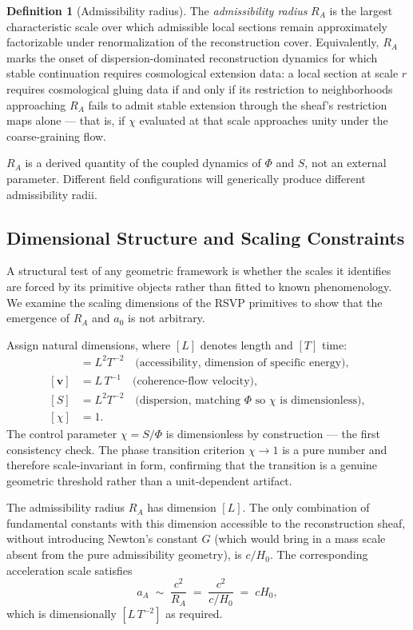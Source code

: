 \documentclass[11pt, a4paper]{article}
\theoremstyle{plain}
\theoremstyle{definition}
\newtheorem{definition}[theorem]{Definition}
\theoremstyle{remark}
\newcommand{\RA}{R_{\!A}}
\newcommand{\aA}{a_{\!A}}
\begin{document}
\begin{definition}[Admissibility radius]
\label{def:RA}
The \emph{admissibility radius} $\RA$ is the largest characteristic scale over which
admissible local sections remain approximately factorizable under renormalization of
the reconstruction cover. Equivalently, $\RA$ marks the onset of
dispersion-dominated reconstruction dynamics for which stable continuation requires
cosmological extension data: a local section at scale $r$ requires cosmological
gluing data if and only if its restriction to neighborhoods approaching $\RA$ fails
to admit stable extension through the sheaf's restriction maps alone --- that is, if
$\chi$ evaluated at that scale approaches unity under the coarse-graining flow.
\end{definition}

$\RA$ is a derived quantity of the coupled dynamics of $\Phi$ and $S$, not an
external parameter. Different field configurations will generically produce different
admissibility radii.

\subsection{Dimensional Structure and Scaling Constraints}
\label{sec:dimensional}

A structural test of any geometric framework is whether the scales it identifies are
forced by its primitive objects rather than fitted to known phenomenology. We examine
the scaling dimensions of the RSVP primitives to show that the emergence of $\RA$ and
$a_0$ is not arbitrary.

Assign natural dimensions, where $[L]$ denotes length and $[T]$ time:
\begin{align*}
  [\Phi] &= L^2 T^{-2} \quad \text{(accessibility, dimension of specific energy)}, \\
  [\mathbf{v}] &= L\,T^{-1} \quad \text{(coherence-flow velocity)}, \\
  [S] &= L^2 T^{-2} \quad \text{(dispersion, matching $\Phi$ so $\chi$ is dimensionless)}, \\
  [\chi] &= 1.
\end{align*}
The control parameter $\chi = S/\Phi$ is dimensionless by construction --- the first
consistency check. The phase transition criterion $\chi \to 1$ is a pure number and
therefore scale-invariant in form, confirming that the transition is a genuine
geometric threshold rather than a unit-dependent artifact.

The admissibility radius $\RA$ has dimension $[L]$. The only combination of
fundamental constants with this dimension accessible to the reconstruction sheaf,
without introducing Newton's constant $G$ (which would bring in a mass scale absent
from the pure admissibility geometry), is $c/H_0$. The corresponding acceleration
scale satisfies
\[
  \aA \;\sim\; \frac{c^2}{\RA} \;=\; \frac{c^2}{c/H_0} \;=\; cH_0,
\]
which is dimensionally $[L\,T^{-2}]$ as required.
\end{document}
